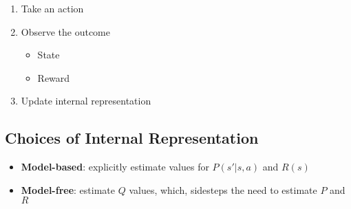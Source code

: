   \begin{enumerate}
    \item Take an action
    \item Observe the outcome
    \begin{itemize}
      \item State
      \item Reward
    \end{itemize}

    \item Update internal representation
  \end{enumerate}

  \subsection{Choices of Internal Representation}

    \begin{itemize}
      \item \textbf{Model-based}: explicitly estimate values for
      $ P\left( s' | s, a \right) $ and $ R\left( s \right) $
      \item \textbf{Model-free}: estimate $ Q $ values, which, sidesteps the
      need to estimate $ P $ and $ R $
    \end{itemize}

